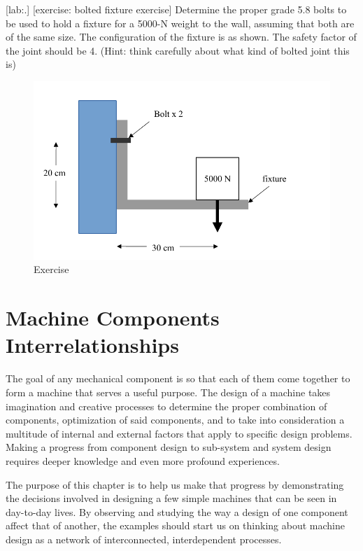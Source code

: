 \documentclass[a4paper,openany,nobib]{tufte-book}
\begin{document}
{{[lab:.]
[exercise: bolted fixture exercise] Determine the proper grade 5.8 bolts
to be used to hold a fixture for a 5000-N weight to the wall, assuming
that both are of the same size. The configuration of the fixture is as
shown. The safety factor of the joint should be 4. (Hint: think
carefully about what kind of bolted joint this is)


\begin{figure}[htbp]
\centering
\includegraphics[width=.9\linewidth]{pictures/Bolt/bolted-fixture-exercise.pdf}
\caption{Exercise}
\end{figure}

\section{Machine Components Interrelationships}
\label{machine-components-interrelationships}
The goal of any mechanical component is so that each of them come
together to form a machine that serves a useful purpose. The design of a
machine takes imagination and creative processes to determine the proper
combination of components, optimization of said components, and to take
into consideration a multitude of internal and external factors that
apply to specific design problems. Making a progress from component
design to sub-system and system design requires deeper knowledge and
even more profound experiences.

The purpose of this chapter is to help us make that progress by
demonstrating the decisions involved in designing a few simple machines
that can be seen in day-to-day lives. By observing and studying the way
a design of one component affect that of another, the examples should
start us on thinking about machine design as a network of
interconnected, interdependent processes.

}}
\end{document}
